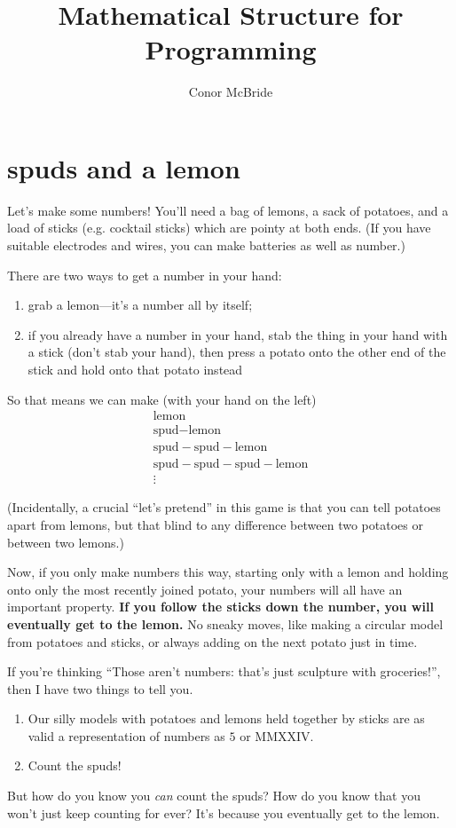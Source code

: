 \documentclass{book}
\begin{document}
\title{Mathematical Structure for Programming}
\author{Conor McBride}
\maketitle

\chapter{spuds and a lemon}

Let's make some numbers! You'll need a bag of lemons, a sack of potatoes, and a load of sticks (e.g. cocktail sticks) which are pointy at both ends. (If you have suitable electrodes and wires, you can make batteries as well as number.)

There are two ways to get a number in your hand:
\begin{enumerate}
\item grab a lemon---it's a number all by itself;
  \item if you already have a number in your hand, stab the thing in your hand with a stick (don't stab your hand), then press a potato onto the other end of the stick and hold onto that potato instead
\end{enumerate}

\newcommand{\spud}{\mbox{spud}\!\!\!-\!\!\!}
\newcommand{\lemon}{\mbox{lemon}}
So that means we can make (with your hand on the left)
\[\begin{array}{l}
\lemon\\
\spud\lemon\\
\spud\spud\lemon\\
\spud\spud\spud\lemon\\
\vdots
\end{array}\]

(Incidentally, a crucial ``let's pretend'' in this game is that you can tell potatoes apart from lemons, but that blind to any difference between two potatoes or between two lemons.)

Now, if you only make numbers this way, starting only with a lemon and holding onto only the most recently joined potato, your numbers will all have an important property. \textbf{If you follow the sticks down the number, you will eventually get to the lemon.} No sneaky moves, like making a circular model from potatoes and sticks, or always adding on the next potato just in time.

If you're thinking ``Those aren't numbers: that's just sculpture with groceries!'', then I have two things to tell you.
\begin{enumerate}
\item Our silly models with potatoes and lemons held together by sticks are as valid a representation of numbers as $5$ or MMXXIV.
\item Count the spuds!
\end{enumerate}
But how do you know you \emph{can} count the spuds? How do you know that you won't just keep counting for ever? It's because you eventually get to the lemon.
\end{document}
